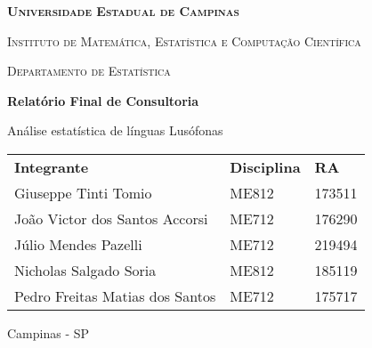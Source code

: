 \begin{titlepage}
	\begin{center}
		\textsc{\textbf{\large Universidade Estadual de Campinas}}

		\textsc{Instituto de Matemática, Estatística e Computação Científica}

		\textsc{Departamento de Estatística}

		\vspace{3cm}
		\textbf{\Large Relatório Final de Consultoria}

        \vspace{1.5mm}
		{\large Análise estatística de línguas Lusófonas}

		\vspace{4cm}
		\begin{flushright}
			\begin{tabular}{lll}
				\textbf{Integrante}                 & \textbf{Disciplina} & \textbf{RA} \\
				Giuseppe Tinti Tomio                & ME812               & 173511 \\[-0.75mm]
				João Victor dos Santos Accorsi      & ME712               & 176290 \\[-0.75mm]
				Júlio Mendes Pazelli                & ME712               & 219494 \\[-0.75mm]
				Nicholas Salgado Soria              & ME812               & 185119 \\[-0.75mm]
				Pedro Freitas Matias dos Santos     & ME712               & 175717 \\[-0.75mm]
			\end{tabular}
		\end{flushright}

		\vfill
		Campinas - SP
	\end{center}
\end{titlepage}
